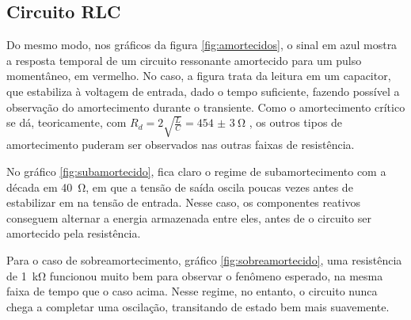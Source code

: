 \subsection{Circuito RLC}

Do mesmo modo, nos gráficos da figura \ref{fig:amortecidos}, o sinal em azul mostra a resposta temporal de um circuito ressonante amortecido para um pulso momentâneo, em vermelho. No caso, a figura trata da leitura em um capacitor, que estabiliza à voltagem de entrada, dado o tempo suficiente, fazendo possível a observação do amortecimento durante o transiente. Como o amortecimento crítico se dá, teoricamente, com $R_d = 2 \sqrt{\frac{L}{C}} = \SI{454(3)}{\ohm}$ \cite{ref:circuitos}, os outros tipos de amortecimento puderam ser observados nas outras faixas de resistência.

No gráfico \ref{fig:subamortecido}, fica claro o regime de subamortecimento com a década em \SI{40}{\ohm}, em que a tensão de saída oscila poucas vezes antes de estabilizar em na tensão de entrada. Nesse caso, os componentes reativos conseguem alternar a energia armazenada entre eles, antes de o circuito ser amortecido pela resistência.

Para o caso de sobreamortecimento, gráfico \ref{fig:sobreamortecido}, uma resistência de \SI{1}{\kilo\ohm} funcionou muito bem para observar o fenômeno esperado, na mesma faixa de tempo que o caso acima. Nesse regime, no entanto, o circuito nunca chega a completar uma oscilação, transitando de estado bem mais suavemente.
